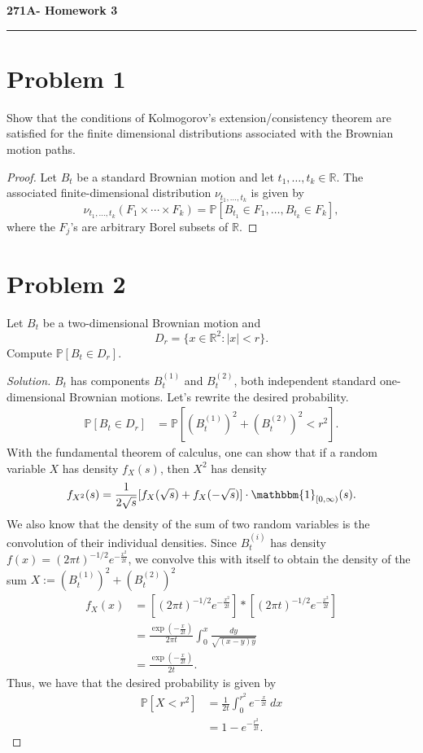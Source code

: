 \documentclass[11pt,letterpaper]{report}
\newcommand{\reals}{\mathbb{R}}
\newcommand{\Prob}{\mathbb{P}}
\newcommand{\ind}{\mathbbm{1}}
\newenvironment{solution}
{\begin{proof}[Solution]}
{\end{proof}}
\begin{document}
\begin{center}
{\bf \Large 271A- Homework 3}
\vspace{0.2cm}
\hrule
\end{center}

\section*{Problem 1}
Show that the conditions of Kolmogorov's extension/consistency theorem are satisfied for the finite dimensional distributions associated with the Brownian motion paths.
\begin{proof}
	Let $B_t$ be a standard Brownian motion and let $t_1, \ldots, t_k\in \reals$. The associated finite-dimensional distribution $\nu_{t_1, \ldots, t_k}$ is given by
	\[
	\nu_{t_1, \ldots, t_k}(F_1\times \cdots \times F_k) = \Prob[B_{t_1}\in F_1,\ldots, B_{t_k}\in F_k],
	\]
	where the $F_j$'s are arbitrary Borel subsets of $\reals$.
\end{proof}

\section*{Problem 2}
Let $B_t$ be a two-dimensional Brownian motion and
\[
D_r = \{x\in \reals^2: |x|<r\}.
\]
Compute $\Prob[B_t\in D_r]$.
\begin{solution}
	$B_t$ has components $B^{(1)}_t$ and $B^{(2)}_t$, both independent standard one-dimensional Brownian motions. Let's rewrite the desired probability.
	\begin{align*}
		\Prob[B_t\in D_r] &= \Prob[(B^{(1)}_t)^2 + (B^{(2)}_t)^2 < r^2].
	\end{align*}
	With the fundamental theorem of calculus, one can show that if a random variable $X$ has density $f_X(s)$, then $X^2$ has density
	\[
	f_{X^2}(s) = \frac{1}{2\sqrt{s}}[f_X(\sqrt{s}) + f_X(-\sqrt{s})]\cdot \ind_{[0, \infty)}(s).
	\]
	We also know that the density of the sum of two random variables is the convolution of their individual densities. Since $B_t^{({i})}$ has density $f(x) = (2\pi t)^{-1/2}e^{-\frac{x^2}{2t}}$, we convolve this with itself to obtain the density of the sum $X := (B^{(1)}_t)^2 + (B^{(2)}_t)^2$
	\begin{align*}
		f_X(x) &= \left[(2\pi t)^{-1/2}e^{-\frac{x^2}{2t}}\right]*\left[(2\pi t)^{-1/2}e^{-\frac{x^2}{2t}}\right]\\
		&= \frac{\exp(-\frac{x}{2t})}{2\pi t}\int_0^x\frac{dy}{\sqrt{(x-y)y}}\\
		&= \frac{\exp(-\frac{x}{2t})}{2t}.
	\end{align*}
	Thus, we have that the desired probability is given by
	\begin{align*}
		\Prob[X<r^2] &= \frac{1}{2t}\int_0^{r^2}e^{-\frac{x}{2t}}\ dx\\
		&= 1-e^{-\frac{r^2}{2t}}.
	\end{align*}
\end{solution}
\end{document}
